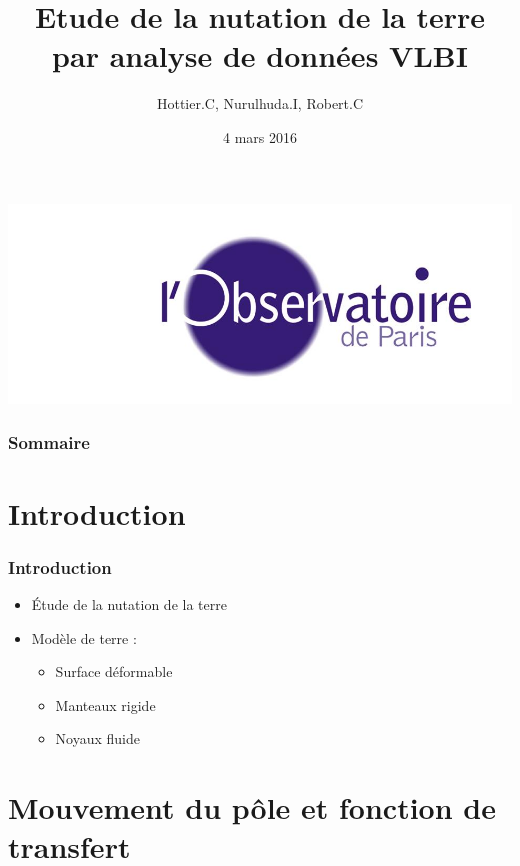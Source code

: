 \documentclass[french]{beamer}
\title[Soutenance MT3]{Etude de la nutation de la terre par analyse de données VLBI}
\author{
Hottier.C, Nurulhuda.I, Robert.C}
\date{4 mars 2016}
\newcommand{\frtt}[1]{\frametitle{#1}}
\begin{document}
\begin{frame}
  \maketitle
  \begin{center}
    \includegraphics[height=0.20\textheight]{Figures/siteon0.jpg}
  \end{center}
\end{frame}

\begin{frame}
  \frametitle{Sommaire}
  \tableofcontents
\end{frame}

\section{Introduction}

\begin{frame}
  \frtt{Introduction}

  \begin{itemize}
    \item \'Etude de la nutation de la terre 
    \item Modèle de terre :
      \begin{itemize}
        \item Surface déformable
        \item Manteaux rigide
        \item Noyaux fluide
      \end{itemize}
  \end{itemize}

\end{frame}


\section{Mouvement du pôle et fonction de transfert}
\end{document}
